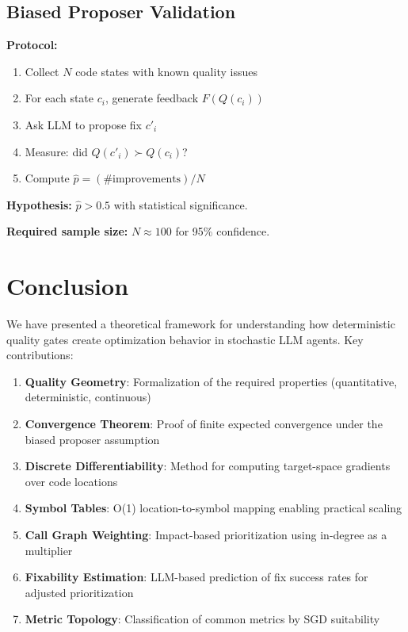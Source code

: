 \documentclass[11pt,a4paper]{article}
\begin{document}
\subsection{Biased Proposer Validation}

\textbf{Protocol:}
\begin{enumerate}
  \item Collect $N$ code states with known quality issues
  \item For each state $c_i$, generate feedback $F(Q(c_i))$
  \item Ask LLM to propose fix $c'_i$
  \item Measure: did $Q(c'_i) \succ Q(c_i)$?
  \item Compute $\hat{p} = (\text{\# improvements}) / N$
\end{enumerate}

\textbf{Hypothesis:} $\hat{p} > 0.5$ with statistical significance.

\textbf{Required sample size:} $N \approx 100$ for 95\% confidence.

\section{Conclusion}
\label{sec:conclusion}

We have presented a theoretical framework for understanding how deterministic quality gates create optimization behavior in stochastic LLM agents. Key contributions:

\begin{enumerate}
  \item \textbf{Quality Geometry}: Formalization of the required properties (quantitative, deterministic, continuous)
  \item \textbf{Convergence Theorem}: Proof of finite expected convergence under the biased proposer assumption
  \item \textbf{Discrete Differentiability}: Method for computing target-space gradients over code locations
  \item \textbf{Symbol Tables}: O(1) location-to-symbol mapping enabling practical scaling
  \item \textbf{Call Graph Weighting}: Impact-based prioritization using in-degree as a multiplier
  \item \textbf{Fixability Estimation}: LLM-based prediction of fix success rates for adjusted prioritization
  \item \textbf{Metric Topology}: Classification of common metrics by SGD suitability
\end{enumerate}
\end{document}

